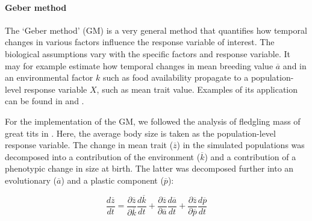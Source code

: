 \paragraph{Geber method}
The `Geber method' (GM) \parencite{Hairston2005} is a very general method that quantifies how temporal changes in various factors influence the response variable of interest. The biological assumptions vary with the specific factors and response variable. It may for example estimate how temporal changes in mean breeding value $\overline{a}$ and in an environmental factor $k$ such as food availability propagate to a population-level response variable $X$, such as mean trait value. Examples of its application can be found in \cite{Ellner2011} and \cite{Becks2012}.

For the implementation of the GM, we followed the analysis of fledgling mass of great tits in \cite{Ellner2011}. Here, the average body size is taken as the population-level response variable. The change in mean trait ($\overline z$) in the simulated populations was decomposed into a contribution of the environment ($\overline k$) and a contribution of a phenotypic change in size at birth. The latter was decomposed further into an evolutionary ($\overline a$) and a plastic component ($\overline p$):

\begin{equation}
\frac{d \overline{z}}{dt} = \frac{\partial \overline{z}}{\partial \overline{k}} \frac{d\overline{k}}{dt} + \frac{\partial \overline{z}}{\partial \overline{a}}\frac{d \overline{a}}{dt} + \frac{\partial \overline{z}}{\partial \overline{p}}\frac{d\overline{p}}{dt} 
\end{equation}

